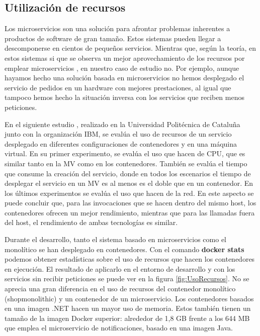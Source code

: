 \documentclass[11pt,spanish,listoffigures]{tfgetsinf}
\begin{document}
\subsection{Utilización de recursos}

Los microservicios son una solución para afrontar problemas inherentes a productos de software de gran tamaño. Estos sistemas pueden llegar a descomponerse en cientos de pequeños servicios. Mientras que, según la teoría, en estos sistemas si que se observa un mejor aprovechamiento de los recursos por emplear microservicios \cite{DelaTorre2018}, en nuestro caso de estudio no. Por ejemplo, aunque hayamos hecho una solución basada en microservicios no hemos desplegado el servicio de pedidos en un hardware con mejores prestaciones, al igual que tampoco hemos hecho la situación inversa con los servicios que reciben menos peticiones.

En el siguiente estudio \cite{Amaral2016}, realizado en la Universidad Politécnica de Cataluña junto con la organización IBM, se evalúa el uso de recursos de un servicio desplegado en diferentes configuraciones de contenedores y en una máquina virtual. En su primer experimento, se evalúa el uso que hacen de CPU, que es similar tanto en la MV como en los contenedores. También se evalúa el tiempo que consume la creación del servicio, donde en todos los escenarios el tiempo de desplegar el servicio en un MV es al menos es el doble que en un contenedor. En los últimos experimentos se evalúa el uso que hacen de la red. En este aspecto se puede concluir que, para las invocaciones que se hacen dentro del mismo host, los contenedores ofrecen un mejor rendimiento, mientras que para las llamadas fuera del host, el rendimiento de ambas tecnologías es similar.

Durante el desarrollo, tanto el sistema basado en microservicios como el monolítico se han desplegado en contenedores. Con el comando \textbf{docker stats} podemos obtener estadísticas sobre el uso de recursos que hacen los contenedores en ejecución. El resultado de aplicarlo en el entorno de desarrollo y con los servicios sin recibir peticiones se puede ver en la figura \ref{fig:UsoRecursos}. No se aprecia una gran diferencia en el uso de recursos del contenedor monolítico (shopmonolithic) y un contenedor de un microservicio. Los contenedores basados en una imagen .NET hacen un mayor uso de memoria. Estos también tienen un tamaño de la imagen Docker superior: alrededor de 1,8 GB frente a los 644 MB que emplea el microservicio de notificaciones, basado en una imagen Java.
\end{document}
